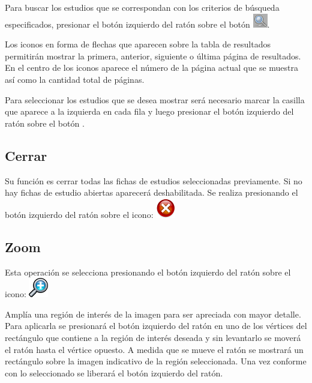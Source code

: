 \documentclass{plantilla-manual-usuario}
\begin{document}
Para buscar los estudios que se correspondan con los criterios de búsqueda especificados, presionar el botón izquierdo del ratón sobre el botón \includegraphics[scale=0.5]{images/buscar.png}.

Los iconos en forma de flechas que aparecen sobre la tabla de resultados permitirán mostrar la primera, anterior, siguiente o última página de resultados. En el centro de los iconos aparece el número de la página actual que se muestra así como la cantidad total de páginas. 

Para seleccionar los estudios que se desea mostrar será necesario marcar la casilla que aparece a la izquierda en cada fila y luego presionar el botón izquierdo del ratón sobre el botón .

\subsection{Cerrar}

Su función es cerrar todas las fichas de estudios seleccionadas previamente. Si no hay fichas de estudio abiertas aparecerá deshabilitada. Se realiza presionando el botón izquierdo del ratón sobre el icono: \includegraphics[scale=0.5]{images/close.png}

\subsection{Zoom}\label{subsectionZoomImagen}

Esta operación se selecciona presionando el botón izquierdo del ratón sobre el icono: \includegraphics[scale=0.5]{images/magnifier.png}

Amplía una región de interés de la imagen para ser apreciada con mayor detalle. Para aplicarla se presionará el botón izquierdo del ratón en uno de los vértices del rectángulo que contiene a la región de interés deseada y sin levantarlo se moverá el ratón hasta el vértice opuesto. A medida que se mueve el ratón se mostrará un rectángulo sobre la imagen indicativo de la región seleccionada. Una vez conforme con lo seleccionado se liberará el botón izquierdo del ratón. 
\end{document}
